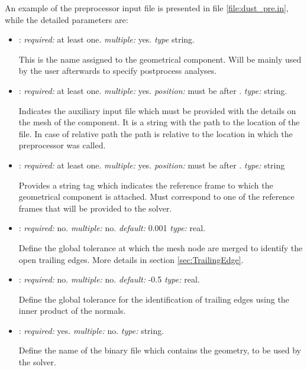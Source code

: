An example of the preprocessor input file is presented in file \ref{file:dust_pre.in}, while the detailed parameters are:
\begin{itemize}
\item {}: \textit{required:} at least one. \textit{multiple:} yes. \textit{type} string.

This is the name assigned to the geometrical component. Will be mainly used by the user afterwards to specify postprocess analyses.

\item {}: \textit{required:} at least one. \textit{multiple:} yes. \textit{position:} must be after . \textit{type:} string. 

Indicates the auxiliary input file which must be provided with the details on the mesh of the component. It is a string with the path to the location of the file. In case of relative path the path is relative to the location in which the preprocessor was called.

\item {}: \textit{required:} at least one. \textit{multiple:} yes. \textit{position:} must be after . \textit{type:} string

Provides a string tag which indicates the reference frame to which the geometrical component is attached. Must correspond to one of the reference frames that will be provided to the solver. 

\item {}: \textit{required:} no. \textit{multiple:} no. \textit{default:} 0.001  \textit{type:} real.

Define the global tolerance at which the mesh node are merged to identify the open trailing edges. More details in section \ref{sec:TrailingEdge}.

\item {}: \textit{required:} no. \textit{multiple:} no. \textit{default:} -0.5 \textit{type:} real.

Define the global tolerance for the identification of trailing edges using the inner product of the normals.

\item {}: \textit{required:} yes. \textit{multiple:} no. \textit{type:} string.

Define the name of the binary file which contains the geometry, to be used by the solver.
\end{itemize}

